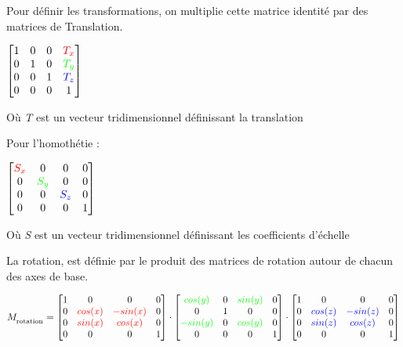 \documentclass[11pt, a4paper, titlepage]{article}
\begin{document}
Pour définir les transformations, on multiplie cette matrice identité
par des matrices de Translation.

\begin{math}
  \begin{bmatrix}
    1 & 0 & 0 & \color{red}{T_x} \\
    0 & 1 & 0 & \color{green}{T_y} \\
    0 & 0 & 1 & \color{blue}{T_z} \\
    0 & 0 & 0 & 1
  \end{bmatrix}
\end{math}

Où \emph{T} est un vecteur tridimensionnel définissant la translation

Pour l'homothétie :

\begin{math}
  \begin{bmatrix}
    \color{red}{S_x} & 0                  & 0                 & 0 \\
    0                & \color{green}{S_y} & 0                 & 0 \\
    0                & 0                  & \color{blue}{S_z} & 0 \\
    0 & 0 & 0 & 1
  \end{bmatrix}
\end{math}

Où \emph{S} est un vecteur tridimensionnel définissant les
coefficients d'échelle

La rotation, est définie par le produit des matrices de rotation
autour de chacun des axes de base.

\begin{math}
  M_\textsubscript{rotation} =
  \begin{bmatrix}
    1 & 0     & 0        & 0 \\
    0 & \color{red}{cos(x)} & \color{red}{-sin(x)} & 0 \\
    0 & \color{red}{sin(x)} & \color{red}{cos(x)}  & 0 \\
    0 & 0 & 0 & 1
  \end{bmatrix}
  \cdot
  \begin{bmatrix}
    \color{green}{cos(y)}  & 0 & \color{green}{sin(y)}    & 0 \\
    0                    & 1 & 0                        & 0 \\
    \color{green}{-sin(y)} & 0 & \color{green}{cos(y)}    & 0 \\
    0 & 0 & 0 & 1
  \end{bmatrix}
  \cdot
  \begin{bmatrix}
    1 & 0      & 0       & 0 \\
    0 & \color{blue}{cos(z)} & \color{blue}{-sin(z)} & 0 \\
    0 & \color{blue}{sin(z)} & \color{blue}{cos(z)}  & 0 \\
    0 & 0 & 0 & 1
  \end{bmatrix}
\end{math}
\end{document}
